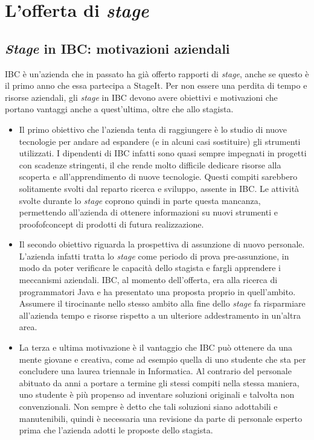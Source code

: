 
\chapter{L'offerta di \textit{stage}}
\label{cap:loffertadistage}

\section{\textit{Stage} in IBC: motivazioni aziendali}
	\label{sec:motivazioni_aziendali}
	IBC è un'azienda che in passato ha già offerto rapporti di \textit{stage}, anche se questo è il primo anno che essa partecipa a StageIt. Per non essere una perdita di tempo e risorse aziendali, gli \textit{stage} in IBC devono avere obiettivi e motivazioni che portano vantaggi anche a quest'ultima, oltre che allo stagista.
	
	\begin{itemize}
		\item Il primo obiettivo che l'azienda tenta di raggiungere è lo studio di nuove tecnologie per andare ad espandere (e in alcuni casi sostituire) gli strumenti utilizzati. I dipendenti di IBC infatti sono quasi sempre impegnati in progetti con scadenze stringenti, il che rende molto difficile dedicare risorse alla scoperta e all'apprendimento di nuove tecnologie. Questi compiti sarebbero solitamente svolti dal reparto ricerca e sviluppo, assente in IBC. Le attività svolte durante lo \textit{stage} coprono quindi in parte questa mancanza, permettendo all'azienda di ottenere informazioni su nuovi strumenti e \gls{proofofconcept} di prodotti di futura realizzazione.
		
		
		\item Il secondo obiettivo riguarda la prospettiva di assunzione di nuovo personale. L'azienda infatti tratta lo \textit{stage} come periodo di prova pre-assunzione, in modo da poter verificare le capacità dello stagista e fargli apprendere i meccanismi aziendali. IBC, al momento dell'offerta, era alla ricerca di programmatori Java e ha presentato una proposta proprio in quell'ambito. Assumere il tirocinante nello stesso ambito alla fine dello \textit{stage} fa risparmiare all'azienda tempo e risorse rispetto a un ulteriore addestramento in un'altra area.
		
		
		\item La terza e ultima motivazione è il vantaggio che IBC può ottenere da una mente giovane e creativa, come ad esempio quella di uno studente che sta per concludere una laurea triennale in Informatica. Al contrario del personale abituato da anni a portare a termine gli stessi compiti nella stessa maniera, uno studente è più propenso ad inventare soluzioni originali e talvolta non convenzionali. Non sempre è detto che tali soluzioni siano adottabili e manutenibili, quindi è necessaria una revisione da parte di personale esperto prima che l'azienda adotti le proposte dello stagista.
	\end{itemize}

